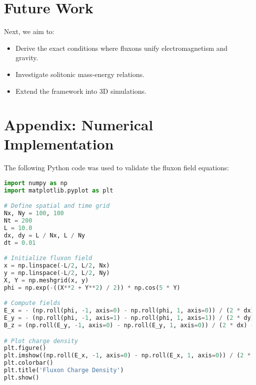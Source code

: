 \documentclass{article}
\begin{document}
\section{Future Work}
Next, we aim to:
\begin{itemize}
    \item Derive the exact conditions where fluxons unify electromagnetism and gravity.
    \item Investigate solitonic mass-energy relations.
    \item Extend the framework into 3D simulations.
\end{itemize}

\section{Appendix: Numerical Implementation}
The following Python code was used to validate the fluxon field equations:

\begin{lstlisting}[language=Python, caption=Fluxonic Field Simulation]
import numpy as np
import matplotlib.pyplot as plt

# Define spatial and time grid
Nx, Ny = 100, 100
Nt = 200
L = 10.0
dx, dy = L / Nx, L / Ny
dt = 0.01

# Initialize fluxon field
x = np.linspace(-L/2, L/2, Nx)
y = np.linspace(-L/2, L/2, Ny)
X, Y = np.meshgrid(x, y)
phi = np.exp(-((X**2 + Y**2) / 2)) * np.cos(5 * Y)

# Compute fields
E_x = - (np.roll(phi, -1, axis=0) - np.roll(phi, 1, axis=0)) / (2 * dx)
E_y = - (np.roll(phi, -1, axis=1) - np.roll(phi, 1, axis=1)) / (2 * dy)
B_z = (np.roll(E_y, -1, axis=0) - np.roll(E_y, 1, axis=0)) / (2 * dx) - (np.roll(E_x, -1, axis=1) - np.roll(E_x, 1, axis=1)) / (2 * dy)

# Plot charge density
plt.figure()
plt.imshow((np.roll(E_x, -1, axis=0) - np.roll(E_x, 1, axis=0)) / (2 * dx) + (np.roll(E_y, -1, axis=1) - np.roll(E_y, 1, axis=1)) / (2 * dy), cmap='inferno')
plt.colorbar()
plt.title('Fluxon Charge Density')
plt.show()
\end{lstlisting}
\end{document}

